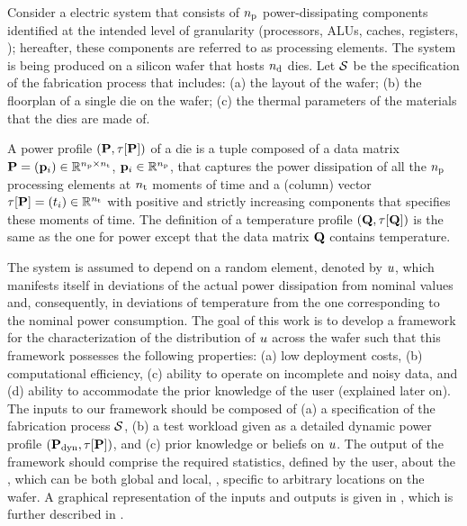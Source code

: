 Consider a electric system that consists of ${n_\text{p}}$ power-dissipating components identified at the intended level of granularity (processors, ALUs, caches, registers, \etc); hereafter, these components are referred to as processing elements.
The system is being produced on a silicon wafer that hosts ${n_\text{d}}$ dies.
Let $\mathcal{S}$ be the specification of the fabrication process that includes: (a) the layout of the wafer; (b) the floorplan of a single die on the wafer; (c) the thermal parameters of the materials that the dies are made of.

A power profile $\profileP$ of a die is a tuple composed of a data matrix $\mathbf{P} = (\mathbf{p}_i) \in \mathbb{R}^{{n_\text{p}} \times {n_\text{t}}}$, $\mathbf{p}_i \in \mathbb{R}^{n_\text{p}}$, that captures the power dissipation of all the ${n_\text{p}}$ processing elements at ${n_\text{t}}$ moments of time and a (column) vector $\tau[\mathbf{P}] = (t_i) \in \mathbb{R}^{{n_\text{t}}}$ with positive and strictly increasing components that specifies these moments of time.
The definition of a temperature profile $\profileT$ is the same as the one for power except that the data matrix $\mathbf{Q}$ contains temperature.

The system is assumed to depend on a random element, denoted by $u$, which manifests itself in deviations of the actual power dissipation from nominal values and, consequently, in deviations of temperature from the one corresponding to the nominal power consumption.
The goal of this work is to develop a framework for the characterization of the distribution of $u$ across the wafer such that this framework possesses the following properties: (a) low deployment costs, (b) computational efficiency, (c) ability to operate on incomplete and noisy data, and (d) ability to accommodate the prior knowledge of the user (explained later on).
The inputs to our framework should be composed of (a) a specification of the fabrication process $\mathcal{S}$, (b) a test workload given as a detailed dynamic power profile $(\mathbf{P}_{\text{dyn}}, \tau[\mathbf{P}])$, and (c) prior knowledge or beliefs on $u$.
The output of the framework should comprise the required statistics, defined by the user, about the \qoi, which can be both global and local, \ie, specific to arbitrary locations on the wafer.
A graphical representation of the inputs and outputs is given in , which is further described in .

